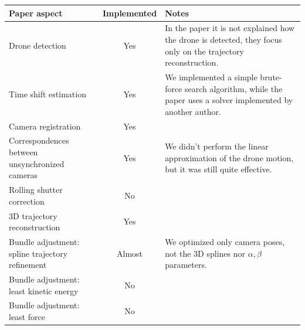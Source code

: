 \documentclass[11pt]{article}
\begin{document}
\begin{table}[H]
    \centering
    \renewcommand{\arraystretch}{1.2}
    \begin{tabularx}{\textwidth}{|Y|c|Y|}
        \hline
        \textbf{Paper aspect}                           & \textbf{Implemented} & \textbf{Notes}                                                                                                     \\
        \hline
        Drone detection                                 & Yes                  & In the paper it is not explained how the drone is detected, they focus only on the trajectory reconstruction.      \\\hline
        Time shift estimation                           & Yes                  & We implemented a simple brute-force search algorithm, while the paper uses a solver implemented by another author. \\\hline
        Camera registration                             & Yes                  &                                                                                                                    \\\hline
        Correspondences between unsynchronized cameras  & Yes                  & We didn't perform the linear approximation of the drone motion, but it was still quite effective.                  \\\hline
        Rolling shutter correction                      & No                   &                                                                                                                    \\\hline
        3D trajectory reconstruction                    & Yes                  &                                                                                                                    \\\hline
        Bundle adjustment: spline trajectory refinement & Almost               & We optimized only camera poses, not the 3D splines nor $\alpha,\beta$ parameters.                                  \\\hline
        Bundle adjustment: least kinetic energy         & No                   &                                                                                                                    \\\hline
        Bundle adjustment: least force                  & No                   &                                                                                                                    \\\hline

\end{tabularx}
\end{table}
\end{document}
